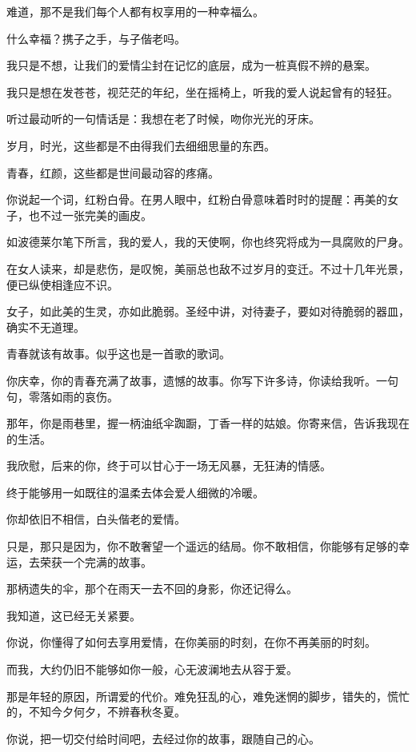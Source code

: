 		难道，那不是我们每个人都有权享用的一种幸福么。\par
		什么幸福？携子之手，与子偕老吗。\par
		我只是不想，让我们的爱情尘封在记忆的底层，成为一桩真假不辨的悬案。\par
		我只是想在发苍苍，视茫茫的年纪，坐在摇椅上，听我的爱人说起曾有的轻狂。\par
		听过最动听的一句情话是：我想在老了时候，吻你光光的牙床。

		岁月，时光，这些都是不由得我们去细细思量的东西。\par
		青春，红颜，这些都是世间最动容的疼痛。

		你说起一个词，红粉白骨。在男人眼中，红粉白骨意味着时时的提醒：再美的女子，也不过一张完美的画皮。\par
		如波德莱尔笔下所言，我的爱人，我的天使啊，你也终究将成为一具腐败的尸身。\par
		在女人读来，却是悲伤，是叹惋，美丽总也敌不过岁月的变迁。不过十几年光景，便已纵使相逢应不识。\par
		女子，如此美的生灵，亦如此脆弱。圣经中讲，对待妻子，要如对待脆弱的器皿，确实不无道理。

		青春就该有故事。似乎这也是一首歌的歌词。\par
		你庆幸，你的青春充满了故事，遗憾的故事。你写下许多诗，你读给我听。一句句，零落如雨的哀伤。\par
		那年，你是雨巷里，握一柄油纸伞踟蹰，丁香一样的姑娘。你寄来信，告诉我现在的生活。\par
		我欣慰，后来的你，终于可以甘心于一场无风暴，无狂涛的情感。\par
		终于能够用一如既往的温柔去体会爱人细微的冷暖。\par
		你却依旧不相信，白头偕老的爱情。\par
		只是，那只是因为，你不敢奢望一个遥远的结局。你不敢相信，你能够有足够的幸运，去荣获一个完满的故事。\par
		那柄遗失的伞，那个在雨天一去不回的身影，你还记得么。\par
		我知道，这已经无关紧要。\par
		你说，你懂得了如何去享用爱情，在你美丽的时刻，在你不再美丽的时刻。

		而我，大约仍旧不能够如你一般，心无波澜地去从容于爱。\par
		那是年轻的原因，所谓爱的代价。难免狂乱的心，难免迷惘的脚步，错失的，慌忙的，不知今夕何夕，不辨春秋冬夏。\par
		你说，把一切交付给时间吧，去经过你的故事，跟随自己的心。

